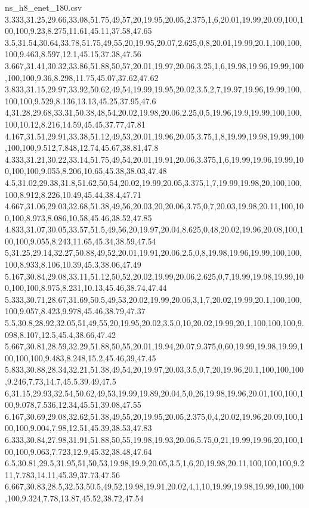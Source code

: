 \begin{filecontents*}[overwrite]{ns_h8_enet_180.csv}
3.333,31.25,29.66,33.08,51.75,49,57,20,19.95,20.05,2.375,1,6,20.01,19.99,20.09,100,100,100,9.23,8.275,11.61,45.11,37.58,47.65
3.5,31.54,30.64,33.78,51.75,49,55,20,19.95,20.07,2.625,0,8,20.01,19.99,20.1,100,100,100,9.463,8.597,12.1,45.15,37.38,47.56
3.667,31.41,30.32,33.86,51.88,50,57,20.01,19.97,20.06,3.25,1,6,19.98,19.96,19.99,100,100,100,9.36,8.298,11.75,45.07,37.62,47.62
3.833,31.15,29.97,33.92,50.62,49,54,19.99,19.95,20.02,3.5,2,7,19.97,19.96,19.99,100,100,100,9.529,8.136,13.13,45.25,37.95,47.6
4,31.28,29.68,33.31,50.38,48,54,20.02,19.98,20.06,2.25,0,5,19.96,19.9,19.99,100,100,100,10.12,8.216,14.59,45.45,37.77,47.81
4.167,31.51,29.91,33.38,51.12,49,53,20.01,19.96,20.05,3.75,1,8,19.99,19.98,19.99,100,100,100,9.512,7.848,12.74,45.67,38.81,47.8
4.333,31.21,30.22,33.14,51.75,49,54,20.01,19.91,20.06,3.375,1,6,19.99,19.96,19.99,100,100,100,9.055,8.206,10.65,45.38,38.03,47.48
4.5,31.02,29.38,31.8,51.62,50,54,20.02,19.99,20.05,3.375,1,7,19.99,19.98,20,100,100,100,8.912,8.226,10.49,45.44,38.4,47.71
4.667,31.06,29.03,32.68,51.38,49,56,20.03,20,20.06,3.75,0,7,20.03,19.98,20.11,100,100,100,8.973,8.086,10.58,45.46,38.52,47.85
4.833,31.07,30.05,33.57,51.5,49,56,20,19.97,20.04,8.625,0,48,20.02,19.96,20.08,100,100,100,9.055,8.243,11.65,45.34,38.59,47.54
5,31.25,29.14,32.27,50.88,49,52,20.01,19.91,20.06,2.5,0,8,19.98,19.96,19.99,100,100,100,8.933,8.106,10.39,45.3,38.06,47.49
5.167,30.84,29.08,33.11,51.12,50,52,20.02,19.99,20.06,2.625,0,7,19.99,19.98,19.99,100,100,100,8.975,8.231,10.13,45.46,38.74,47.44
5.333,30.71,28.67,31.69,50.5,49,53,20.02,19.99,20.06,3,1,7,20.02,19.99,20.1,100,100,100,9.057,8.423,9.978,45.46,38.79,47.37
5.5,30.8,28.92,32.05,51,49,55,20,19.95,20.02,3.5,0,10,20.02,19.99,20.1,100,100,100,9.098,8.107,12.5,45.4,38.66,47.42
5.667,30.81,28.59,32.29,51.88,50,55,20.01,19.94,20.07,9.375,0,60,19.99,19.98,19.99,100,100,100,9.483,8.248,15.2,45.46,39,47.45
5.833,30.88,28.34,32.21,51.38,49,54,20,19.97,20.03,3.5,0,7,20,19.96,20.1,100,100,100,9.246,7.73,14.7,45.5,39.49,47.5
6,31.15,29.93,32.54,50.62,49,53,19.99,19.89,20.04,5,0,26,19.98,19.96,20.01,100,100,100,9.078,7.536,12.34,45.51,39.08,47.55
6.167,30.69,29.08,32.62,51.38,49,55,20,19.95,20.05,2.375,0,4,20.02,19.96,20.09,100,100,100,9.004,7.98,12.51,45.39,38.53,47.83
6.333,30.84,27.98,31.91,51.88,50,55,19.98,19.93,20.06,5.75,0,21,19.99,19.96,20,100,100,100,9.063,7.723,12.9,45.32,38.48,47.64
6.5,30.81,29.5,31.95,51,50,53,19.98,19.9,20.05,3.5,1,6,20,19.98,20.11,100,100,100,9.211,7.783,14.11,45.39,37.73,47.56
6.667,30.83,28.5,32.53,50.5,49,52,19.98,19.91,20.02,4,1,10,19.99,19.98,19.99,100,100,100,9.324,7.78,13.87,45.52,38.72,47.54

\end{filecontents*}
